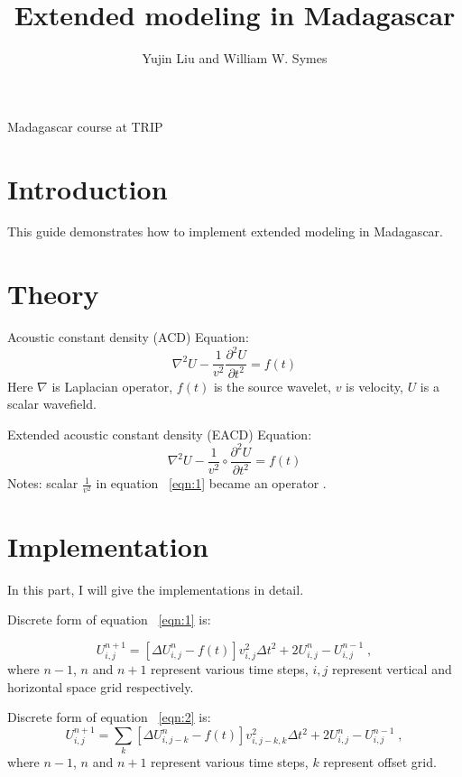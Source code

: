 
\author{Yujin Liu and William W. Symes}
\title{Extended modeling in Madagascar}{Madagascar course at TRIP}


\section{Introduction}

This guide demonstrates how to implement extended modeling in Madagascar.


\section{Theory}

Acoustic constant density (ACD) Equation:
\begin{equation}
    \nabla^2 U - \frac{1}{v^2} \frac{\partial^2 U}{\partial t^2} = f(t)
\label{eqn:1}
\end{equation}
Here $\nabla$ is Laplacian operator, $f(t)$ is the source wavelet, $v$ is velocity, $U$ is a scalar wavefield.

Extended acoustic constant density (EACD) Equation:
\begin{equation}
    \nabla^2 U - \frac{1}{v^2} \circ \frac{\partial^2 U}{\partial t^2} = f(t)
\label{eqn:2}
\end{equation}
Notes: scalar $\frac{1}{v^2}$ in equation ~\ref{eqn:1} became an operator \cite[]{symes_geopro_2008,krebs_fast_2009,duquet_3d_1999}.


\section{Implementation}
In this part, I will give the implementations in detail.

Discrete form of equation ~\ref{eqn:1} is:

\begin{equation}
U^{n+1}_{i,j} = \left[ \Delta U^{n}_{i,j} -f(t) \right] v^2_{i,j} \Delta t^2 + 2 U^{n}_{i,j} - U^{n-1}_{i,j} \;,
\end{equation}
where $n-1$, $n$ and $n+1$ represent various time steps, ${i,j}$ represent vertical and horizontal space grid respectively.

Discrete form of equation ~\ref{eqn:2} is:
\begin{equation}
U^{n+1}_{i,j} = \sum_k \left[ \Delta U^{n}_{i,j-k} -f(t) \right] v^2_{i,j-k,k} \Delta t^2 + 2 U^{n}_{i,j} - U^{n-1}_{i,j} \;,
\end{equation}
where $n-1$, $n$ and $n+1$ represent various time steps, ${k}$ represent offset grid.

